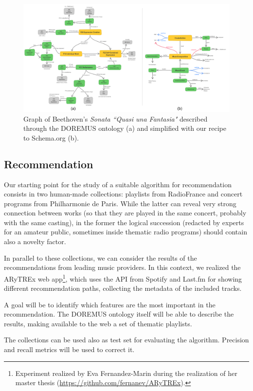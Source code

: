 \documentclass{llncs}
\begin{document}
\begin{figure}
\includegraphics[width=12cm]{img/Beethoven-mapping.png}
\centering
\caption{Graph of Beethoven's \textit{Sonata ``Quasi una Fantasia"} described through the DOREMUS ontology (a) and simplified with our recipe to Schema.org  (b).}
\label{fig:beethoven-mapping}
\end{figure}


\subsection{Recommendation} Our starting point for the study of a suitable algorithm for recommendation consists in two human-made collections: playlists from RadioFrance and concert programs from Philharmonie de Paris. While the latter can reveal very strong connection between works (so that they are played in the same concert, probably with the same casting), in the former the logical succession (redacted by experts for an amateur public, sometimes inside thematic radio programs) should contain also a novelty factor.

In parallel to these collections, we can consider the results of the recommendations from leading music providers. In this context, we realized the ARyTREx web app\footnote{Experiment realized by Eva Fernandez-Marin during the realization of her master thesis (\url{https://github.com/fernanev/ARyTREx}).}, which uses the API from Spotify and Last.fm for showing different recommendation paths, collecting the metadata of the included tracks. 

A goal will be to identify which features are the most important in the recommendation. The DOREMUS ontology itself will be able to describe the results, making available to the web a set of thematic playlists.

The collections can be used also as test set for evaluating the algorithm. Precision and recall metrics will be used to correct it.
\end{document}
